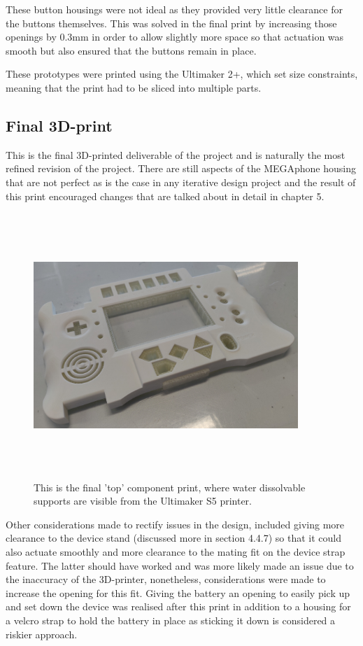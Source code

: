 These button housings were not ideal as they provided very little clearance for the buttons themselves.
This was solved in the final print by increasing those openings by 0.3mm in order to allow slightly more space so that actuation was smooth but also ensured that the buttons remain in place.

These prototypes were printed using the Ultimaker 2+, which set size constraints, meaning that the print had to be sliced into multiple parts.

\subsection{Final 3D-print} \label{FinalPrint}

This is the final 3D-printed deliverable of the project and is naturally the most refined revision of the project. 
There are still aspects of the MEGAphone housing that are not perfect as is the case in any iterative design project and the result of this print encouraged changes that are talked about in detail in chapter 5.

\begin{figure} [h]
    \centering
    \includegraphics[width=10cm,height=10cm,keepaspectratio]{Figures/topwatersupport.png}
    \caption{This is the final 'top' component print, where water dissolvable supports are visible from the Ultimaker S5 printer.}
    \label{fig:thirdtop}
\end{figure}

Other considerations made to rectify issues in the design, included giving more clearance to the device stand (discussed more in section 4.4.7) so that it could also actuate smoothly and more clearance to the mating fit on the device strap feature.
The latter should have worked and was more likely made an issue due to the inaccuracy of the 3D-printer, nonetheless, considerations were made to increase the opening for this fit.
Giving the battery an opening to easily pick up and set down the device was realised after this print in addition to a housing for a velcro strap to hold the battery in place as sticking it down is considered a riskier approach.

